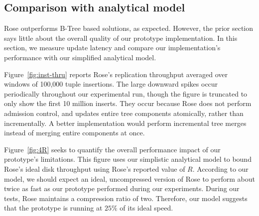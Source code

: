 \documentclass{vldb}
\newcommand{\rows}{Rose\xspace}
\newcommand{\rowss}{Rose's\xspace}
\begin{document}

\subsection{Comparison with analytical model}

\rows outperforms B-Tree based solutions, as expected.  However, the
prior section says little about the overall quality of our prototype
implementation.  In this section, we measure update latency and compare
our implementation's performance with our simplified analytical model.

Figure~\ref{fig:inst-thru} reports \rowss replication throughput
averaged over windows of 100,000 tuple insertions.  The large downward
spikes occur periodically throughout our experimental run, though the
figure is truncated to only show the first 10 million inserts.  They
occur because \rows does not perform admission control, and updates
entire tree components atomically, rather than incrementally.
A better implementation would perform
incremental tree merges instead of merging entire components at once.

Figure~\ref{fig:4R} seeks to quantify the overall performance
impact of our prototype's
limitations.  This figure uses our simplistic analytical model
to bound \rowss ideal disk throughput using \rowss
reported value of $R$.  According to our
model, we should expect an ideal, uncompressed version of \rows to
perform about twice as fast as our prototype performed during our experiments.  During our tests, \rows
maintains a compression ratio of two.  Therefore, our model suggests
that the prototype is running at $25\%$ of its ideal speed.

\end{document}
